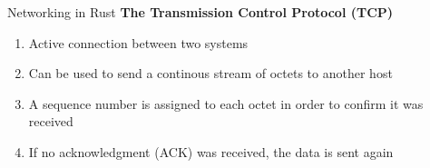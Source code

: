 \begin{frame}{Networking in Rust}
    \textbf{The Transmission Control Protocol (TCP)}
    \begin{enumerate}
        \item<2-> Active connection between two systems
        \item<3-> Can be used to send a continous stream of octets to another host
        \item<4-> A sequence number is assigned to each octet in order to confirm it was received
        \item<5> If no acknowledgment (ACK) was received, the data is sent again
    \end{enumerate}

\end{frame}
